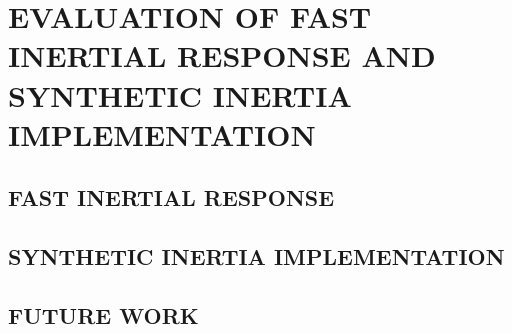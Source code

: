 \chapter{EVALUATION OF FAST INERTIAL RESPONSE AND SYNTHETIC INERTIA IMPLEMENTATION}
\label{chp:6}



\section{FAST INERTIAL RESPONSE}

\section{SYNTHETIC INERTIA IMPLEMENTATION}

\section{FUTURE WORK}